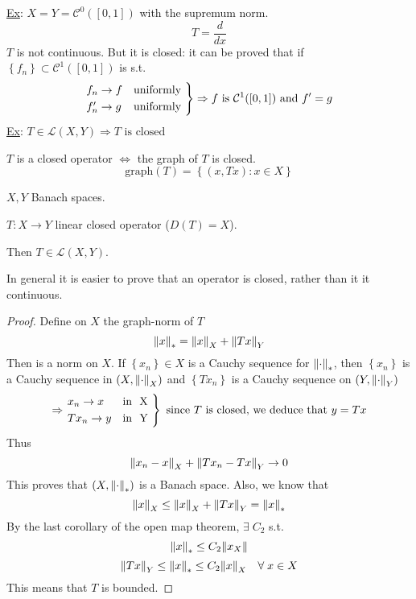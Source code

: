 \noindent\underline{Ex}: \(X = Y = \mathcal{C}^0([0,1])\) with the supremum norm.
\[
    T = \frac{d}{dx}
\]
\(T\) is not continuous. But it is closed: it can be proved that if \(\left\{ f_n \right\} \subset \mathcal{C}^1([0,1])\) is s.t.
\[
    \begin{rcases*}
        f_n \to f & \mbox{uniformly} \\
        f_n' \to g & \mbox{uniformly}
    \end{rcases*} \Rightarrow f \mbox{ is } \mathcal{C}^1([0,1]) \mbox{ and } f' = g
\] 
\noindent\underline{Ex}: \(T \in \mathcal{L}(X,Y) \Rightarrow T \mbox{ is closed}\)
\begin{remark}
    \(T\) is a closed operator \(\Leftrightarrow\) the graph of \(T\) is closed.
    \[
        \mbox{graph}(T) = \left\{ (x, Tx): x \in X \right\}
    \]
\end{remark}
\begin{theorem}
    \(X, Y\) Banach spaces. 
    
    \(T : X \to Y\) linear closed operator (\(D(T) = X\)). 
    
    Then \(T \in \mathcal{L}(X,Y)\).
\end{theorem}
\begin{remark}
    In general it is easier to prove that an operator is closed, rather than it it continuous.
\end{remark}
\begin{proof}
    Define on \(X\) the graph-norm of \(T\)
    \[
        \norm{x}_* = \norm{x}_X + \norm{Tx}_Y
    \]
    Then is a norm on \(X\). If \(\left\{ x_n \right\} \in X\) is a Cauchy sequence for \(\norm{\cdot}_*\), then \(\left\{ x_n \right\}\) is a Cauchy sequence in \((X, \norm{\cdot}_X)\) and \(\left\{ Tx_n \right\}\) is a Cauchy sequence on \((Y, \norm{\cdot}_Y)\)
    \[
        \Rightarrow \begin{rcases*}
            x_n \to x & \mbox{in } X \\
            Tx_n \to y & \mbox{in } Y
        \end{rcases*} \mbox{ since } T \mbox{ is closed, we deduce that } y = Tx
    \]
    Thus 
    \[
        \norm{x_n - x}_X + \norm{Tx_n - Tx}_Y \to 0
    \]
    This proves that \((X, \norm{\cdot}_*)\) is a Banach space. Also, we know that 
    \[
        \norm{x}_X \leq \norm{x}_X + \norm{Tx}_Y = \norm{x}_*
    \]
    By the last corollary of the open map theorem, \(\exists \; C_2\) s.t. 
    \[
        \norm{x}_* \leq C_2 \norm{x_X}
    \]
    \[
        \norm{Tx}_Y \leq \norm{x}_* \leq C_2 \norm{x}_X \quad \forall \; x \in X
    \]
    This means that \(T\) is bounded.
\end{proof}